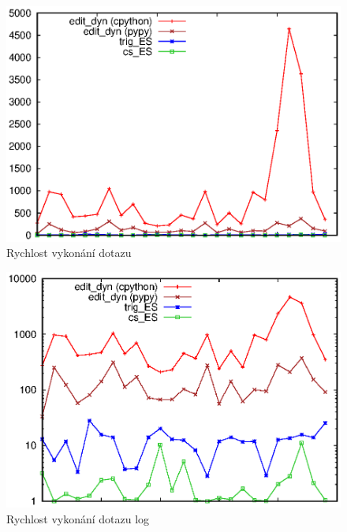 \begin{minipage}{.45\textwidth}\vspace{0pt}
\begin{figure}[H]
\includegraphics{figures/timings.eps}
\caption{Rychlost vykonání dotazu}
\label{fig:timings}
\end{figure}
\end{minipage}
\begin{minipage}{.45\textwidth}\vspace{0pt}
\begin{figure}[H]
\includegraphics{figures/timings_log.eps}
\caption{Rychlost vykonání dotazu log}
\label{fig:timings_log}
\end{figure}
\end{minipage}
